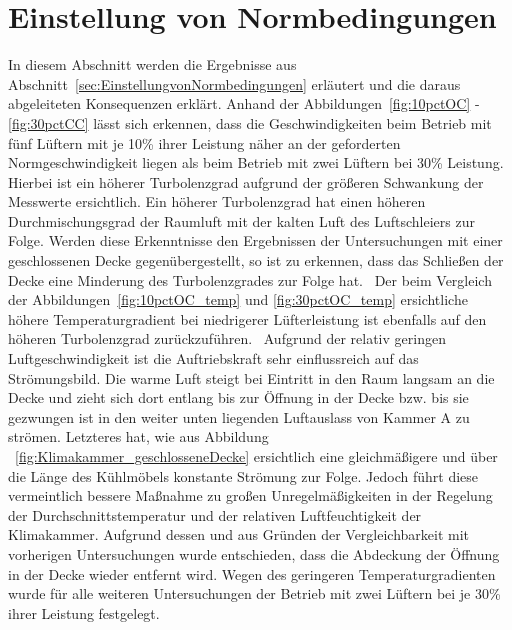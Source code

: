 \section{Einstellung von Normbedingungen}
\label{sec:Einstellung von Normbedingungen_1}

In diesem Abschnitt werden die Ergebnisse aus Abschnitt~\ref{sec:EinstellungvonNormbedingungen} erläutert und die daraus abgeleiteten Konsequenzen erklärt. Anhand der Abbildungen~\ref{fig:10pctOC} - \ref{fig:30pctCC} lässt sich erkennen, dass die Geschwindigkeiten beim Betrieb mit fünf Lüftern mit je \unit{10}{\%} ihrer Leistung näher an der geforderten Normgeschwindigkeit liegen als beim Betrieb mit zwei Lüftern bei \unit{30}{\%} Leistung. Hierbei ist ein höherer Turbolenzgrad aufgrund der größeren Schwankung der Messwerte ersichtlich. Ein höherer Turbolenzgrad hat einen höheren Durchmischungsgrad der Raumluft mit der kalten Luft des Luftschleiers zur Folge. 
Werden diese Erkenntnisse den Ergebnissen der Untersuchungen mit einer geschlossenen Decke gegenübergestellt, so ist zu erkennen, dass das Schließen der Decke eine Minderung des Turbolenzgrades zur Folge hat. \
Der beim Vergleich der Abbildungen~\ref{fig:10pctOC_temp} und \ref{fig:30pctOC_temp} ersichtliche höhere Temperaturgradient bei niedrigerer Lüfterleistung ist ebenfalls auf den höheren Turbolenzgrad zurückzuführen. \
Aufgrund der relativ geringen Luftgeschwindigkeit ist die Auftriebskraft sehr einflussreich auf das Strömungsbild. Die warme Luft steigt bei Eintritt in den Raum langsam an die Decke und zieht sich dort entlang bis zur Öffnung in der Decke bzw. bis sie gezwungen ist in den weiter unten liegenden Luftauslass von Kammer A zu strömen.
Letzteres hat, wie aus Abbildung ~\ref{fig:Klimakammer_geschlosseneDecke} ersichtlich eine gleichmäßigere und über die Länge des Kühlmöbels konstante Strömung zur Folge.
Jedoch führt diese vermeintlich bessere Maßnahme zu großen Unregelmäßigkeiten in der Regelung der Durchschnittstemperatur und der relativen Luftfeuchtigkeit der Klimakammer. \newline
Aufgrund dessen und aus Gründen der Vergleichbarkeit mit vorherigen Untersuchungen wurde entschieden, dass die Abdeckung der Öffnung in der Decke wieder entfernt wird. Wegen des geringeren Temperaturgradienten wurde für alle weiteren Untersuchungen der Betrieb mit zwei Lüftern bei je \unit{30}{\%} ihrer Leistung festgelegt.












